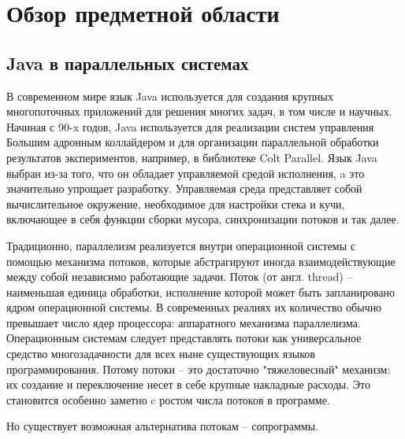 \section{Обзор предметной области}
	\subsection{Java в параллельных системах}
	В современном мире язык Java используется для создания крупных многопоточных приложений 
	для решения многих задач, в том числе и научных. Начиная с 90-x годов, Java используется для реализации
	систем управления Большим адронным коллайдером и для организации параллельной обработки результатов 
	экспериментов, например, в библиотеке Colt Parallel\cite{colt}. Язык Java выбран из-за того, что он 
	обладает управляемой средой исполнения, a это значительно упрощает разработку. Управляемая среда представляет
	собой вычислительное окружение, необходимое для настройки стека и кучи, включающее в себя функции сборки мусора,
	синхронизации потоков и так далее.
	\par
	Традиционно, параллелизм реализуется внутри операционной системы с помощью механизма потоков, 
	которые абстрагируют иногда взаимодействующие между собой независимо работающие задачи. 
	Поток (от англ. thread) -- наименьшая единица обработки, исполнение которой может 
	быть запланировано ядром операционной системы\cite{thread}.
	В современных реалиях их количество обычно превышает число ядер процессора: 
	аппаратного механизма параллелизма. Операционным системам следует представлять потоки
	как универсальное средство многозадачности для всех ныне существующих языков программирования. Потому потоки 
	-- это достаточно "тяжеловесный" механизм: их создание и переключение несет в себе крупные накладные расходы. 
	Это становится особенно заметно c ростом числа потоков в программе. 
	\par
	Но существует возможная альтернатива потокам -- сопрограммы.
	
